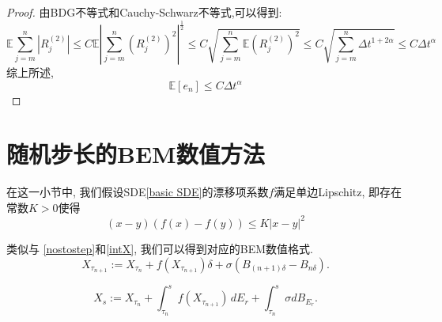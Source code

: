 \begin{proof}
	由BDG不等式和Cauchy-Schwarz不等式,可以得到:
	\begin{equation*}
		\mathbb{E}\sum_{j=m}^{n}\left|R_{j}^{(2)}\right|  \le C\mathbb{E} \left|\sum_{j=m}^{n}(R_{j}^{(2)})^2\right|^{\frac{1}{2}} \le C\sqrt{\sum_{j=m}^{n}\mathbb{E}(R_{j}^{(2)})^2}
		\le C\sqrt{\sum_{j=m}^{n}\Delta t^{1+2\alpha}} \le C\Delta t^{\alpha}
	\end{equation*}
	综上所述,
	\begin{equation*}
		\mathbb{E} [e_n] \leq C\Delta t^\alpha
	\end{equation*}
\end{proof}


\section{随机步长的BEM数值方法}

\begin{assumption}\label{Local Lipschitz}
	在这一小节中, 我们假设SDE\cref{basic SDE}的漂移项系数$f$满足单边Lipschitz, 即存在常数$K>0$使得
	\begin{equation}
		(x-y)(f(x)-f(y)) \le K|x-y|^2
	\end{equation}
\end{assumption}

类似与 \textnormal{\cref{nostostep}}和\textnormal{\cref{intX}},
我们可以得到对应的BEM数值格式.
\begin{equation}\label{nostostepY}
	X_{\tau_{n+1}} :=X_{\tau_n}  + f\left(X_{\tau_{n+1}}\right)\delta + \sigma\left(B_{(n+1)\delta}-B_{n\delta}\right).
\end{equation}

\begin{equation}\label{intY}
	X_s:= X_{\tau_n} +  \int_{\tau_n}^s f\left(X_{\tau_{n+1}}\right) \, dE_r + \int_{\tau_n}^s \sigma dB_{E_r}.
\end{equation}


